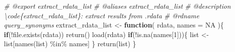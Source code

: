 \documentclass[
]{article}
\newenvironment{Shaded}{\begin{snugshade}}{\end{snugshade}}
\newcommand{\AttributeTok}[1]{\textcolor[rgb]{0.77,0.63,0.00}{#1}}
\newcommand{\CommentTok}[1]{\textcolor[rgb]{0.56,0.35,0.01}{\textit{#1}}}
\newcommand{\ConstantTok}[1]{\textcolor[rgb]{0.00,0.00,0.00}{#1}}
\newcommand{\ControlFlowTok}[1]{\textcolor[rgb]{0.13,0.29,0.53}{\textbf{#1}}}
\newcommand{\DecValTok}[1]{\textcolor[rgb]{0.00,0.00,0.81}{#1}}
\newcommand{\FunctionTok}[1]{\textcolor[rgb]{0.00,0.00,0.00}{#1}}
\newcommand{\NormalTok}[1]{#1}
\newcommand{\OtherTok}[1]{\textcolor[rgb]{0.56,0.35,0.01}{#1}}
\newcommand{\SpecialCharTok}[1]{\textcolor[rgb]{0.00,0.00,0.00}{#1}}
\begin{document}
\begin{Shaded}
\begin{Highlighting}[]
\CommentTok{\#\textquotesingle{} @export extract\_rdata\_list}
\CommentTok{\#\textquotesingle{} @aliases extract\_rdata\_list}
\CommentTok{\#\textquotesingle{} @description \textbackslash{}code\{extract\_rdata\_list\}: extract results from .rdata}
\CommentTok{\#\textquotesingle{} @rdname query\_synonyms}
\NormalTok{extract\_rdata\_list }\OtherTok{\textless{}{-}} 
  \ControlFlowTok{function}\NormalTok{(}
\NormalTok{    rdata,}
    \AttributeTok{names =} \ConstantTok{NA}
\NormalTok{    )\{}
    \ControlFlowTok{if}\NormalTok{(}\SpecialCharTok{!}\FunctionTok{file.exists}\NormalTok{(rdata))}
      \FunctionTok{return}\NormalTok{()}
    \FunctionTok{load}\NormalTok{(rdata)}
    \ControlFlowTok{if}\NormalTok{(}\SpecialCharTok{!}\FunctionTok{is.na}\NormalTok{(names[}\DecValTok{1}\NormalTok{]))\{}
\NormalTok{      list }\OtherTok{\textless{}{-}}\NormalTok{ list[}\FunctionTok{names}\NormalTok{(list) }\SpecialCharTok{\%in\%}\NormalTok{ names]}
\NormalTok{    \}}
    \FunctionTok{return}\NormalTok{(list)}
\NormalTok{  \}}


\end{Highlighting}
\end{Shaded}
\end{document}
